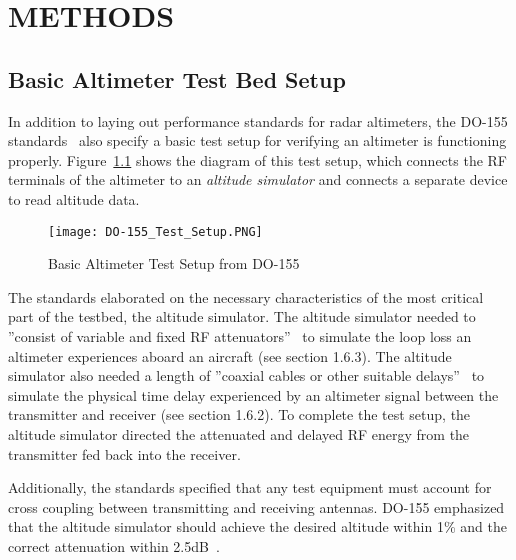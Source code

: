 %
%
%
%



\chapter{METHODS} 
\section{Basic Altimeter Test Bed Setup} \label{sec:Basic}
In addition to laying out performance standards for radar altimeters, the DO-155 standards~\cite{noauthor_minimum_1974} also specify a basic test setup for verifying an altimeter is functioning properly. Figure~\ref{fig:Basic Testbed} shows the diagram of this test setup, which connects the RF terminals of the altimeter to an \textit{altitude simulator} and connects a separate device to read altitude data.  
\begin{figure}[ht]
\centering
\texttt{[image: DO-155\_Test\_Setup.PNG]}
\caption[]{Basic Altimeter Test Setup from DO-155~\cite{noauthor_minimum_1974}}

\label{fig:Basic Testbed}

\end{figure}

The standards elaborated on the necessary characteristics of the most critical part of the testbed, the altitude simulator. The altitude simulator needed to ''consist of variable and fixed RF attenuators''~\cite{noauthor_minimum_1974}  to simulate the loop loss an altimeter experiences aboard an aircraft (see section 1.6.3). The altitude simulator also needed a length of ''coaxial cables or other suitable delays''~\cite{noauthor_minimum_1974}  to simulate the physical time delay experienced by an altimeter signal between the transmitter and receiver (see section 1.6.2). To complete the test setup, the altitude simulator directed the attenuated and delayed RF energy from the transmitter fed back into the receiver. 


Additionally, the standards specified that any test equipment must account for cross coupling between transmitting and receiving antennas. DO-155 emphasized that the altitude simulator should achieve the desired altitude within 1\% and the correct attenuation within 2.5dB~\cite{noauthor_minimum_1974}.

